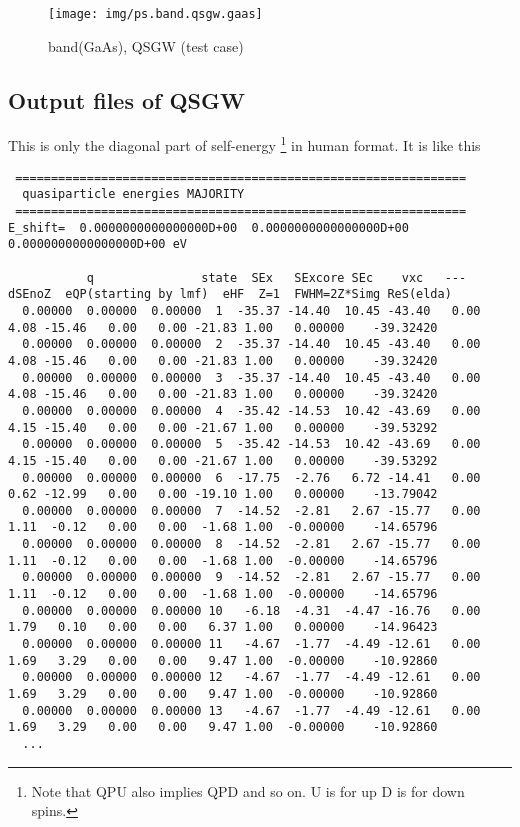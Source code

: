 \documentclass[a4paper,10pt,epsf,fleqn]{article}
\begin{document}

\begin{figure}[hbtp]
  \texttt{[image: img/ps.band.qsgw.gaas]}
  \caption{band(GaAs), QSGW (test case)}
\end{figure}

\subsection{Output files of QSGW }
\label{mainoutput}
This is only the diagonal part of self-energy 
\footnote{Note that QPU also implies QPD and so on. U is for up D is for
down spins.} in human format. It is like this
{\hspace{-1cm}\baselineskip=2.6mm \footnotesize
\begin{verbatim} 
 ===============================================================
  quasiparticle energies MAJORITY
 ===============================================================
E_shift=  0.0000000000000000D+00  0.0000000000000000D+00  0.0000000000000000D+00 eV

           q               state  SEx   SExcore SEc    vxc   ---   dSEnoZ  eQP(starting by lmf)  eHF  Z=1  FWHM=2Z*Simg ReS(elda)
  0.00000  0.00000  0.00000  1  -35.37 -14.40  10.45 -43.40   0.00   4.08 -15.46   0.00   0.00 -21.83 1.00   0.00000    -39.32420
  0.00000  0.00000  0.00000  2  -35.37 -14.40  10.45 -43.40   0.00   4.08 -15.46   0.00   0.00 -21.83 1.00   0.00000    -39.32420
  0.00000  0.00000  0.00000  3  -35.37 -14.40  10.45 -43.40   0.00   4.08 -15.46   0.00   0.00 -21.83 1.00   0.00000    -39.32420
  0.00000  0.00000  0.00000  4  -35.42 -14.53  10.42 -43.69   0.00   4.15 -15.40   0.00   0.00 -21.67 1.00   0.00000    -39.53292
  0.00000  0.00000  0.00000  5  -35.42 -14.53  10.42 -43.69   0.00   4.15 -15.40   0.00   0.00 -21.67 1.00   0.00000    -39.53292
  0.00000  0.00000  0.00000  6  -17.75  -2.76   6.72 -14.41   0.00   0.62 -12.99   0.00   0.00 -19.10 1.00   0.00000    -13.79042
  0.00000  0.00000  0.00000  7  -14.52  -2.81   2.67 -15.77   0.00   1.11  -0.12   0.00   0.00  -1.68 1.00  -0.00000    -14.65796
  0.00000  0.00000  0.00000  8  -14.52  -2.81   2.67 -15.77   0.00   1.11  -0.12   0.00   0.00  -1.68 1.00  -0.00000    -14.65796
  0.00000  0.00000  0.00000  9  -14.52  -2.81   2.67 -15.77   0.00   1.11  -0.12   0.00   0.00  -1.68 1.00  -0.00000    -14.65796
  0.00000  0.00000  0.00000 10   -6.18  -4.31  -4.47 -16.76   0.00   1.79   0.10   0.00   0.00   6.37 1.00   0.00000    -14.96423
  0.00000  0.00000  0.00000 11   -4.67  -1.77  -4.49 -12.61   0.00   1.69   3.29   0.00   0.00   9.47 1.00  -0.00000    -10.92860
  0.00000  0.00000  0.00000 12   -4.67  -1.77  -4.49 -12.61   0.00   1.69   3.29   0.00   0.00   9.47 1.00  -0.00000    -10.92860
  0.00000  0.00000  0.00000 13   -4.67  -1.77  -4.49 -12.61   0.00   1.69   3.29   0.00   0.00   9.47 1.00  -0.00000    -10.92860
  ...
\end{verbatim}}
\end{document}
